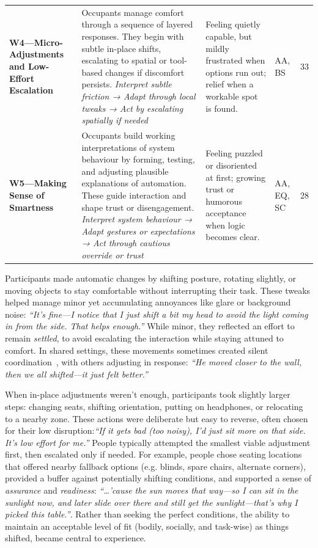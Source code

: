 \begin{maintable}[tbp]
\begin{tabularx}{\linewidth}{@{}p{.20\linewidth} Y p{.20\linewidth} p{.10\linewidth} c@{}}
\textbf{W4---Micro-Adjustments and Low-Effort Escalation} & 
Occupants manage comfort through a sequence of layered responses. They begin with subtle in-place shifts, escalating to spatial or tool-based changes if discomfort persists. \newline 
\textit{Interpret subtle friction → Adapt through local tweaks → Act by escalating spatially if needed} &
Feeling quietly capable, but mildly frustrated when options run out; relief when a workable spot is found. & AA, BS & 33 \\

\textbf{W5---Making Sense of Smartness} & 
Occupants build working interpretations of system behaviour by forming, testing, and adjusting plausible explanations of automation. These guide interaction and shape trust or disengagement. \newline 
\textit{Interpret system behaviour → Adapt gestures or expectations → Act through cautious override or trust} &
Feeling puzzled or disoriented at first; growing trust or humorous acceptance when logic becomes clear. & AA, EQ, SC & 28 \\
\bottomrule
\end{tabularx}
\label{tab:afi-theme-overview}
\end{maintable}

Participants made automatic changes by shifting posture, rotating slightly, or moving objects to stay comfortable without interrupting their task. These tweaks helped manage minor yet accumulating annoyances like glare or background noise: \textit{``It’s fine---I notice that I just shift a bit my head to avoid the light coming in from the side. That helps enough.''} While minor, they reflected an effort to remain \textit{settled}, to avoid escalating the interaction while staying attuned to comfort. In shared settings, these movements sometimes created silent coordination~\cite{hoehl2021interactional}, with others adjusting in response: \textit{“He moved closer to the wall, then we all shifted---it just felt better.”}

When in-place adjustments weren’t enough, participants took slightly larger steps: changing seats, shifting orientation, putting on headphones, or relocating to a nearby zone. These actions were deliberate but easy to reverse, often chosen for their low disruption:\textit{“If it gets bad (too noisy), I’d just sit more on that side. It’s low effort for me.”} People typically attempted the smallest viable adjustment first, then escalated only if needed. For example, people chose seating locations that offered nearby fallback options (e.g. blinds, spare chairs, alternate corners), provided a buffer against potentially shifting conditions, and supported a sense of \textit{assurance} and \textit{readiness}: \textit{“\ldots'cause the sun moves that way---so I can sit in the sunlight now, and later slide over there and still get the sunlight---that’s why I picked this table.”}. Rather than seeking the perfect conditions, the ability to maintain an acceptable level of fit (bodily, socially, and task-wise) as things shifted, became central to experience. 


